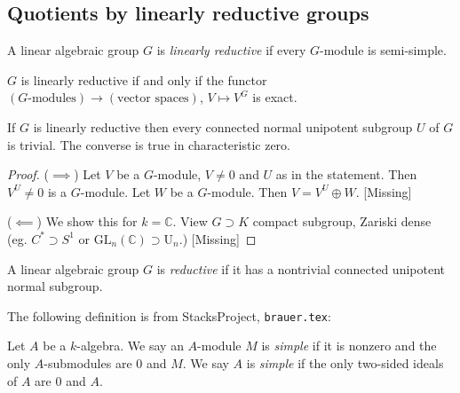 \subsection*{Quotients by linearly reductive groups}
\label{subsection-quotients-by-linearly-reductive-groups}

\begin{definition}
\label{definition-linearly-reductive-group}
A linear algebraic group $G$ is {\it linearly reductive} if every $G$-module is
semi-simple.
\end{definition}

\begin{exercise}
\label{exercise-linearly-reductive-characterization}
$G$ is linearly reductive if and only if the functor 
$(\text{$G$-modules})\to(\text{vector spaces})$, $V \mapsto V^G$ is exact.
\end{exercise}

\begin{theorem}
\label{theorem-linearly-reductive-normal-unipotent-connected-subgroups-are-
trivial}
 If $G$ is linearly reductive then every connected normal unipotent subgroup $U$ 
of $G$ is trivial. The converse is true in characteristic zero.
\end{theorem}

\begin{proof}
($\implies$) Let $V$ be a $G$-module, $V\neq 0$ and $U$ as in the statement.
Then $V^U\neq 0$ is a $G$-module. Let $W$ be a $G$-module. 
Then $V=V^U \oplus W$. [Missing]

($\impliedby$) We show this for $k= \mathbb{C}$. View $G \supset K$ compact
subgroup, Zariski dense (eg. $C^* \supset S^1$ or 
$\text{GL}_n(\mathbb{C})\supset \text{U}_n$.) [Missing]
\end{proof}

\begin{definition}
\label{definition-reductive-linear-algebraic-group}
A linear algebraic group $G$ is {\it reductive} if it has a nontrivial connected
unipotent normal subgroup.
\end{definition}

The following definition is from StacksProject, \texttt{brauer.tex}:

\begin{definition}
\label{definition-simple}
Let $A$ be a $k$-algebra.
We say an $A$-module $M$ is {\it simple} if it is nonzero and
the only $A$-submodules are $0$ and $M$.
We say $A$ is {\it simple} if the only two-sided ideals of $A$ are
$0$ and $A$.
\end{definition}

